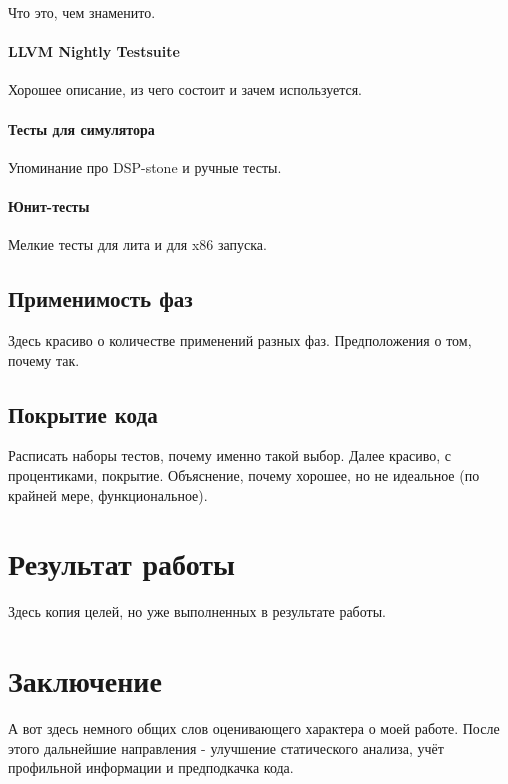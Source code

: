 \documentclass[12pt,a4paper]{article}
\begin{document}
Что это, чем знаменито.

\paragraph{LLVM Nightly Testsuite}

Хорошее описание, из чего состоит и зачем используется.

\paragraph{Тесты для симулятора}

Упоминание про DSP-stone и ручные тесты.

\paragraph{Юнит-тесты}

Мелкие тесты для лита и для x86 запуска.

\subsection{Применимость фаз}

Здесь красиво о количестве применений разных фаз. Предположения о том, почему так.

\subsection{Покрытие кода}

Расписать наборы тестов, почему именно такой выбор. Далее красиво, с процентиками, покрытие. Объяснение, почему хорошее, но не идеальное (по крайней мере, функциональное).

\section{Результат работы}

Здесь копия целей, но уже выполненных в результате работы.

\section{Заключение}

А вот здесь немного общих слов оценивающего характера о моей работе. После этого дальнейшие направления - улучшение статического анализа, учёт профильной информации и предподкачка кода.
\end{document}
